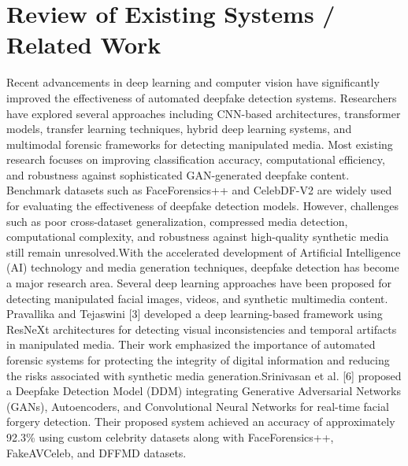 \documentclass[12pt,a4paper]{report}
\begin{document}
\section{Review of Existing Systems / Related Work}

Recent advancements in deep learning and computer vision have significantly improved the effectiveness of automated deepfake detection systems. Researchers have explored several approaches including CNN-based architectures, transformer models, transfer learning techniques, hybrid deep learning systems, and multimodal forensic frameworks for detecting manipulated media. Most existing research focuses on improving classification accuracy, computational efficiency, and robustness against sophisticated GAN-generated deepfake content. Benchmark datasets such as FaceForensics++ and CelebDF-V2 are widely used for evaluating the effectiveness of deepfake detection models. However, challenges such as poor cross-dataset generalization, compressed media detection, computational complexity, and robustness against high-quality synthetic media still remain unresolved.With the accelerated development of Artificial Intelligence (AI) technology and media generation techniques, deepfake detection has become a major research area. Several deep learning approaches have been proposed for detecting manipulated facial images, videos, and synthetic multimedia content. Pravallika and Tejaswini [3] developed a deep learning-based framework using ResNeXt architectures for detecting visual inconsistencies and temporal artifacts in manipulated media. Their work emphasized the importance of automated forensic systems for protecting the integrity of digital information and reducing the risks associated with synthetic media generation.Srinivasan et al. [6] proposed a Deepfake Detection Model (DDM) integrating Generative Adversarial Networks (GANs), Autoencoders, and Convolutional Neural Networks for real-time facial forgery detection. Their proposed system achieved an accuracy of approximately 92.3\% using custom celebrity datasets along with FaceForensics++, FakeAVCeleb, and DFFMD datasets.
\end{document}
